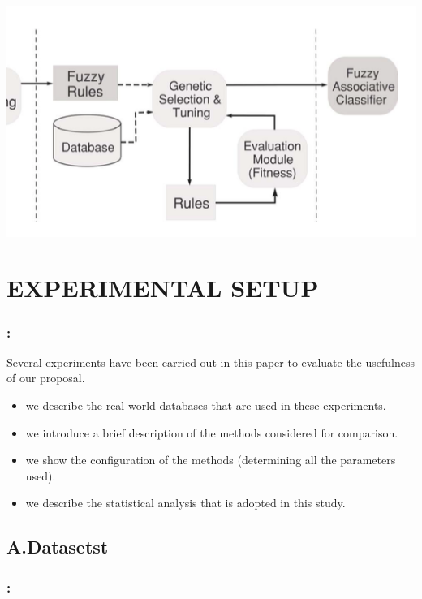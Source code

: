 \documentclass{beamer}
\begin{document}
\begin{CJK*}{UTF8}{bsmi}
\begin{frame}
	\begin{center}
		\includegraphics[height=.65\textheight]{./8.png}
	\end{center}
\end{frame}

\section{EXPERIMENTAL SETUP}

\begin{frame}
	\frametitle{\insertsection : \insertsubsection}
	Several experiments have been carried out in this paper to evaluate the usefulness of our proposal.
	\begin{itemize}
		\item we describe the real-world databases that are used in these experiments.
		\item we introduce a brief description of the methods considered for comparison.
		\item we show the configuration of the methods (determining all the parameters used).
		\item we describe the statistical analysis that is adopted in this study.
	\end{itemize}
\end{frame}

\subsection{A.Datasetst}

\begin{frame}
	\frametitle{\insertsection : \insertsubsection}
	

\end{frame}
\end{CJK*}
\end{document}
